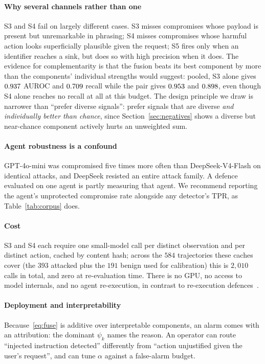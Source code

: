 \documentclass[preprint,12pt,authoryear]{elsarticle}
\theoremstyle{definition}
\begin{document}
\paragraph{Why several channels rather than one} S3 and S4 fail on largely
different cases. S3 misses compromises whose payload is present but unremarkable
in phrasing; S4 misses compromises whose harmful action looks superficially
plausible given the request; S5 fires only when an identifier reaches a sink, but
does so with high precision when it does. The evidence for complementarity is that
the fusion beats its best component by more than the components' individual
strengths would suggest: pooled, S3 alone gives $0.937$ AUROC and
$0.709$ recall while the pair gives $0.953$ and $0.898$,
even though S4 alone reaches no recall at all at this budget. The design principle we draw is narrower
than ``prefer diverse signals'': prefer signals that are diverse \emph{and
individually better than chance}, since Section~\ref{sec:negatives} shows a
diverse but near-chance component actively hurts an unweighted sum.

\paragraph{Agent robustness is a confound} GPT-4o-mini was compromised five
times more often than DeepSeek-V4-Flash on identical attacks, and DeepSeek
resisted an entire attack family. A defence evaluated on one agent is partly
measuring that agent. We recommend reporting the agent's unprotected compromise
rate alongside any detector's TPR, as Table~\ref{tab:corpus} does.

\paragraph{Cost} S3 and S4 each require one small-model call per distinct observation and per distinct
action, cached by content hash; across the $584$ trajectories these caches cover
(the $393$ attacked plus the $191$ benign used for calibration) this is $2{,}010$
calls in total, and zero at re-evaluation time. There is no GPU, no access to model
internals, and no agent re-execution, in contrast to
re-execution defences~\citep{zhu2025melon}.

\paragraph{Deployment and interpretability} Because~\eqref{eq:fuse} is additive
over interpretable components, an alarm comes with an attribution: the dominant
$\psi_k$ names the reason. An operator can route ``injected instruction detected''
differently from ``action unjustified given the user's request'', and can tune
$\alpha$ against a false-alarm budget.
\end{document}
